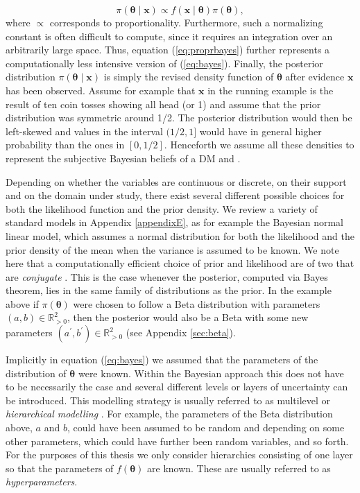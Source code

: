 \begin{equation}
\label{eq:proprbayes}
\pi(\bm{\theta}\;|\;\bm{x})\propto f(\bm{x}\;|\;\bm{\theta})\pi(\bm{\theta}),
\end{equation}
where $\propto$ corresponds to proportionality.  Furthermore, such a normalizing constant is often difficult to compute, since it requires an integration over an arbitrarily large space. Thus, equation (\ref{eq:proprbayes}) further represents a computationally less intensive version of (\ref{eq:bayes}). Finally, the posterior distribution $\pi(\bm{\theta}\;|\;\bm{x})$ is simply the revised density function of $\bm{\theta}$ after  evidence $\bm{x}$ has been observed. Assume for example that $\bm{x}$ in the running example is the result of ten coin tosses showing all head (or 1) and assume that the prior distribution was symmetric around 1/2. The posterior distribution would then be left-skewed and values in the interval $(1/2,1]$ would have in general higher probability than the ones in $[0,1/2]$. Henceforth we assume all these densities to represent the subjective Bayesian beliefs of a \gls{DM} \citep[for more details on the various interpretation of probabilities and the adequateness of the Bayesian interpretation in decision making, see for example ][]{O'Hagan2004a} and \citet{French2000b}.

Depending on whether the variables are continuous or discrete, on their support and  on the domain under study, there exist several different possible choices for both the likelihood function and the prior density. We review a variety of standard models in Appendix \ref{appendixE}, as for example the Bayesian normal linear model, which assumes a normal distribution for both the likelihood and the prior density of the mean when the variance is assumed to be known. We note here that a computationally efficient choice of prior and likelihood are of two that are \textit{conjugate} \citep{Bernardo2009, O'Hagan2004a}. This is the case whenever the posterior, computed via Bayes theorem, lies in the same family of distributions as the prior. In the example above if $\pi(\bm{\theta})$ were chosen to follow a Beta distribution with parameters $(a,b)\in\mathbb{R}^2_{>0}$, then the posterior would also be a Beta with some new parameters $(a^{'},b^{'})\in\mathbb{R}^2_{>0}$ (see Appendix \ref{sec:beta}).

Implicitly in equation (\ref{eq:bayes}) we assumed that the parameters of the distribution of $\bm{\theta}$ were known. Within the Bayesian approach this does not have to be necessarily the case and several different levels or layers of uncertainty can be introduced. This modelling strategy is usually referred to as multilevel or \textit{hierarchical modelling} \citep{Gelman2006}. For example, the parameters of the Beta distribution above, $a$ and $b$, could have been assumed to be random and depending on some other parameters, which could have further been random variables, and so forth. For the purposes of this thesis we only consider hierarchies consisting of one layer so that the parameters of $f(\bm{\theta})$ are known. These are usually referred to as \textit{hyperparameters}. 

